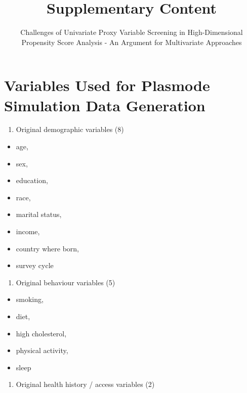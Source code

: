 \documentclass[
  10pt,
]{article}
\title{Supplementary Content}
\subtitle{Challenges of Univariate Proxy Variable Screening in
High-Dimensional Propensity Score Analysis - An Argument for
Multivariate Approaches}
\author{}
\date{\vspace{-2.5em}}
\providecommand{\tightlist}{%
  \setlength{\itemsep}{0pt}\setlength{\parskip}{0pt}}
\begin{document}
\maketitle

\appendix
{}

\edef\tablename{\appendixname~\tablename}
\edef\figurename{\appendixname~\figurename}

\section{Variables Used for Plasmode Simulation Data
Generation}\label{variables-used-for-plasmode-simulation-data-generation}

\begin{enumerate}
\def\labelenumi{\arabic{enumi}.}
\tightlist
\item
  Original demographic variables (8)
\end{enumerate}

\begin{itemize}
\tightlist
\item
  age,
\item
  sex,
\item
  education,
\item
  race,
\item
  marital status,
\item
  income,
\item
  country where born,
\item
  survey cycle
\end{itemize}

\begin{enumerate}
\def\labelenumi{\arabic{enumi}.}
\setcounter{enumi}{1}
\tightlist
\item
  Original behaviour variables (5)
\end{enumerate}

\begin{itemize}
\tightlist
\item
  smoking,
\item
  diet,
\item
  high cholesterol,
\item
  physical activity,
\item
  sleep
\end{itemize}

\begin{enumerate}
\def\labelenumi{\arabic{enumi}.}
\setcounter{enumi}{2}
\tightlist
\item
  Original health history / access variables (2)
\end{enumerate}
\end{document}
